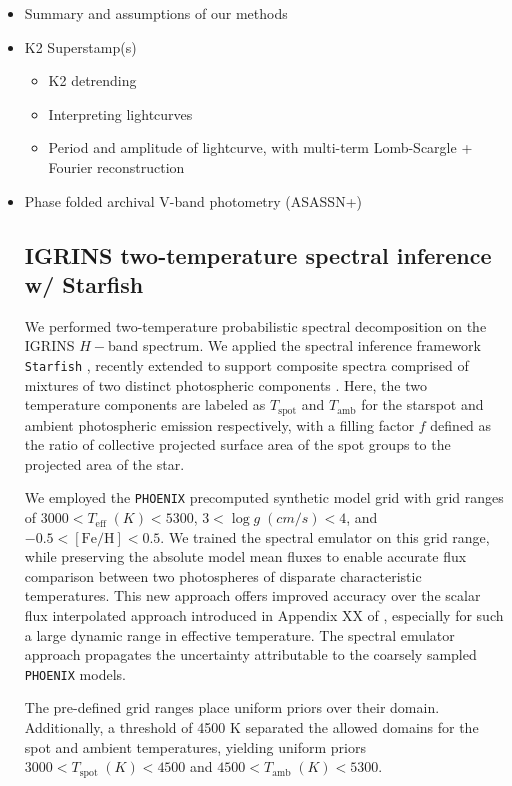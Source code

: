 \documentclass[twocolumn]{emulateapj}%
\begin{document}
\begin{itemize}
\item Summary and assumptions of our methods
\item K2 Superstamp(s)
\begin{itemize}
  \item K2 detrending
  \item Interpreting lightcurves
  \item Period and amplitude of lightcurve, with multi-term Lomb-Scargle + Fourier reconstruction
\end{itemize}
\item Phase folded archival V-band photometry (ASASSN+)
\subsection{IGRINS two-temperature spectral inference w/ Starfish}

We performed two-temperature probabilistic spectral decomposition on the IGRINS $H-$band spectrum.  We applied the spectral inference framework \texttt{Starfish} \citep{czekala15}, recently extended to support composite spectra comprised of mixtures of two distinct photospheric components \citep{2017ApJ...836..200G}.  Here, the two temperature components are labeled as $T_{\mathrm{spot}}$ and $T_{\mathrm{amb}}$ for the starspot and ambient photospheric emission respectively, with a filling factor $f$ defined as the ratio of collective projected surface area of the spot groups to the projected area of the star.

We employed the \texttt{PHOENIX} precomputed synthetic model grid with grid ranges of $3000 < T_{\mathrm{eff}} \; (K) < 5300 $, $3 < \log{g \;(cm/s)}  < 4 $, and $ -0.5 <  [\mathrm{Fe}/\mathrm{H}] <0.5$.  We trained the spectral emulator \citep{czekala15} on this grid range, while preserving the absolute model mean fluxes to enable accurate flux comparison between two photospheres of disparate characteristic temperatures.  This new approach offers improved accuracy over the scalar flux interpolated approach introduced in Appendix XX of \citet{2017ApJ...836..200G}, especially for such a large dynamic range in effective temperature.  The spectral emulator approach propagates the uncertainty attributable to the coarsely sampled \texttt{PHOENIX} models.

The pre-defined grid ranges place uniform priors over their domain.  Additionally, a threshold of 4500 K separated the allowed domains for the spot and ambient temperatures, yielding uniform priors $3000 < T_{\mathrm{spot}} \; (K) < 4500 $ and $4500 < T_{\mathrm{amb}} \; (K) < 5300$.


\end{itemize}
\end{document}
